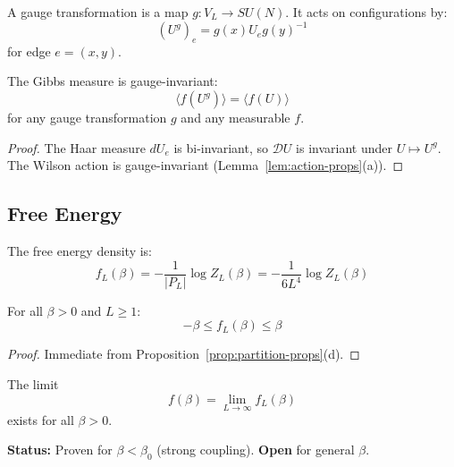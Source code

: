 \begin{definition}
\label{def:gauge-transf}
A gauge transformation is a map $g : V_L \to SU(N)$. It acts on configurations by:
\[
(U^g)_e = g(x) U_e g(y)^{-1}
\]
for edge $e = (x, y)$.
\end{definition}

\begin{proposition}
\label{prop:gauge-inv-measure}
The Gibbs measure is gauge-invariant:
\[
\langle f(U^g) \rangle = \langle f(U) \rangle
\]
for any gauge transformation $g$ and any measurable $f$.
\end{proposition}

\begin{proof}
The Haar measure $dU_e$ is bi-invariant, so $\mathcal{D}U$ is invariant under 
$U \mapsto U^g$. The Wilson action is gauge-invariant (Lemma~\ref{lem:action-props}(a)).
\end{proof}

\subsection{Free Energy}

\begin{definition}
\label{def:free-energy}
The free energy density is:
\[
f_L(\beta) = -\frac{1}{|P_L|} \log Z_L(\beta) = -\frac{1}{6L^4} \log Z_L(\beta)
\]
\end{definition}

\begin{proposition}
For all $\beta > 0$ and $L \geq 1$:
\[
-\beta \leq f_L(\beta) \leq \beta
\]
\end{proposition}

\begin{proof}
Immediate from Proposition~\ref{prop:partition-props}(d).
\end{proof}

\begin{conjecture}
\label{conj:thermo-limit}
The limit
\[
f(\beta) = \lim_{L \to \infty} f_L(\beta)
\]
exists for all $\beta > 0$.
\end{conjecture}

\textbf{Status:} Proven for $\beta < \beta_0$ (strong coupling). \textbf{Open} for 
general $\beta$.


